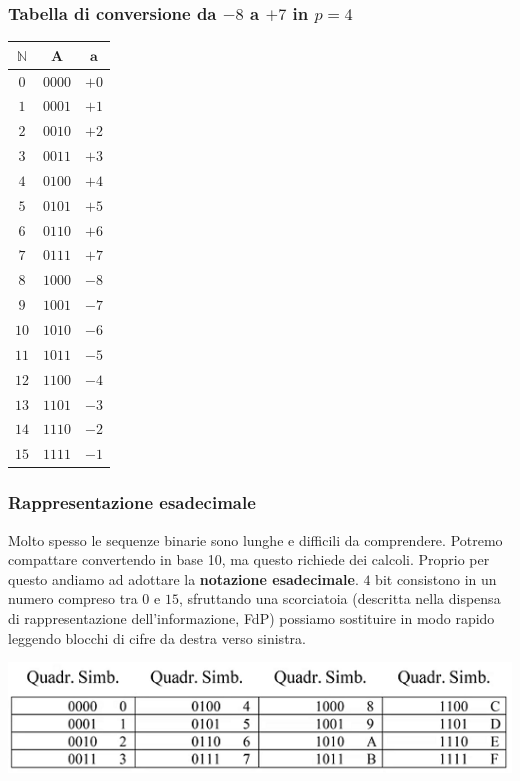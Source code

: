 \documentclass[11pt]{report}
\begin{document}


\subsubsection{Tabella di conversione da $-8$ a $+7$ in $p=4$}
\begin{center}
\begin{tabular}{ |c|c|c| }
 \hline 
$\mathbf{\mathbb{N}}$ & $\mathbf{A}$ & $\mathbf{a}$\\
\hline
 $0$ & $0000$  & $+0$\\ 
 \hline
 $1$ & $0001$  & $+1$\\ 
 \hline
 $2$ & $0010$  & $+2$\\ 
 \hline
 $3$ & $0011$  & $+3$\\ 
 \hline
 $4$ & $0100$  & $+4$\\ 
 \hline
 $5$ & $0101$  & $+5$\\ 
 \hline
 $6$ & $0110$  & $+6$\\ 
 \hline
 $7$ & $0111$  & $+7$\\ 
 \hline
 $8$ & $1000$  & $-8$\\ 
 \hline
 $9$ & $1001$  & $-7$\\ 
 \hline
 $10$ & $1010$  & $-6$\\ 
 \hline
 $11$ & $1011$  & $-5$\\ 
 \hline
 $12$ & $1100$  & $-4$\\ 
 \hline
 $13$ & $1101$  & $-3$\\ 
 \hline
 $14$ & $1110$  & $-2$\\ 
 \hline
 $15$ & $1111$  & $-1$\\ 
 \hline
\end{tabular}
\end{center} 
\subsubsection{Rappresentazione esadecimale}
Molto spesso le sequenze binarie sono lunghe e difficili da comprendere. Potremo compattare convertendo in base 10, ma questo richiede dei calcoli. Proprio per questo andiamo ad adottare la \textbf{notazione esadecimale}. $4$ bit consistono in un numero compreso tra $0$ e $15$, sfruttando una scorciatoia (descritta nella dispensa di rappresentazione dell'informazione, FdP) possiamo sostituire in modo rapido leggendo blocchi di cifre da destra verso sinistra.
\begin{center}
\includegraphics{img/3.PNG}
\end{center}
\end{document}
